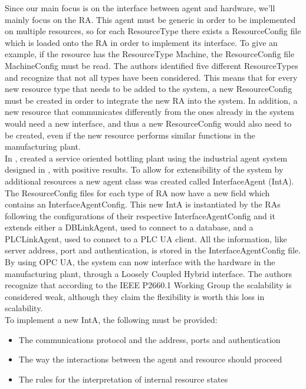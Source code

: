 Since our main focus is on the interface between agent and hardware, we'll mainly focus on the RA. This agent must be generic in order to be implemented on multiple resources, so for each ResourceType there exists a ResourceConfig file which is loaded onto the RA in order to implement its interface. To give an example, if the resource has the ResourceType Machine, the ResourceConfig file MachineConfig must be read. The authors identified five different ResourceTypes and recognize that not all types have been considered. This means that for every new resource type that needs to be added to the system, a new ResourceConfig must be created in order to integrate the new RA into the system. In addition, a new resource that communicates differently from the ones already in the system would need a new interface, and thus a new ResourceConfig would also need to be created, even if the new resource performs similar functions in the manufacturing plant.\\

In \cite{bottling_plant_part2}, \citeauthor{bottling_plant_part2} created a service oriented bottling plant using the industrial agent system designed in \cite{bottling_plant_part1}, with positive results. To allow for extensibility of the system by additional resources a new agent class was created called InterfaceAgent (IntA). The ResourceConfig files for each type of RA now have a new field which contains an InterfaceAgentConfig. This new IntA is instantiated by the RAs following the configurations of their respective InterfaceAgentConfig and it extends either a DBLinkAgent, used to connect to a database, and a PLCLinkAgent, used to connect to a PLC UA client. All the information, like server address, port and authentication, is stored in the InterfaceAgentConfig file. By using OPC UA, the system can now interface with the hardware in the manufacturing plant, through a Loosely Coupled Hybrid interface. The authors recognize that according to the IEEE P2660.1 Working Group the scalability is considered weak, although they claim the flexibility is worth this loss in scalability.\\

To implement a new IntA, the following must be provided:
\begin{itemize}
	\item The communications protocol and the address, ports and authentication
	\item The way the interactions between the agent and resource should proceed
	\item The rules for the interpretation of internal resource states
\end{itemize}

